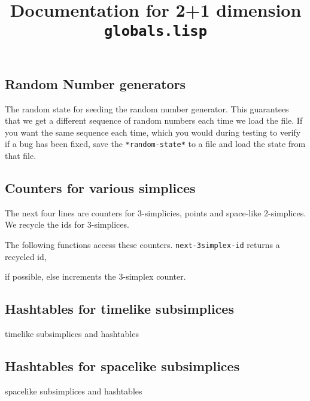 \documentclass[10pt,a4paper,landscape]{article}
\title{Documentation for 2+1 dimension \texttt{globals.lisp}}
\begin{document}
 
\maketitle
\subsection*{Random Number generators}
The random state for seeding the random number generator. This guarantees that 
we get a different sequence of random numbers each time we load the file. If you 
want the same sequence each time, which you would during testing to verify if a 
bug has been fixed, save the \texttt{*random-state*} to a file and load the 
state from that file.


\subsection*{Counters for various simplices}
The next four lines are counters for 3-simplicies, points and space-like 
2-simplices. We recycle the ids for 3-simplices.

The following functions access these counters. \texttt{next-3simplex-id} 
returns a recycled id,

if possible, else increments the 3-simplex counter.

\subsection*{Hashtables for timelike subsimplices}
timelike subsimplices and hashtables


\subsection*{Hashtables for spacelike subsimplices}
spacelike subsimplices and hashtables

\end{document}
